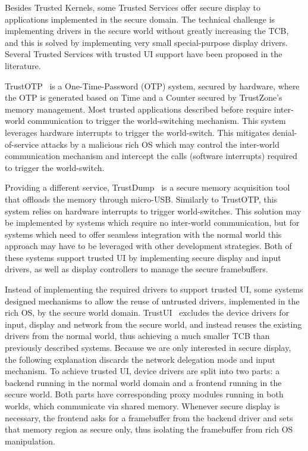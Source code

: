 Besides Trusted Kernels, some Trusted Services offer secure display to applications implemented in the secure domain. The technical challenge is implementing drivers in the secure world without greatly increasing the TCB, and this is solved by implementing very small special-purpose display drivers. Several Trusted Services with trusted UI support have been proposed in the literature.

TrustOTP~\cite{sun2015trustotp} is a One-Time-Password (OTP) system, secured by hardware, where the OTP is generated based on Time and a Counter secured by TrustZone's memory management. Most trusted applications described before require inter-world communication to trigger the world-switching mechanism. This system leverages hardware interrupts to trigger the world-switch. This mitigates denial-of-service attacks by a malicious rich OS which may control the inter-world communication mechanism and intercept the calls (software interrupts) required to trigger the world-switch. 

Providing a different service, TrustDump~\cite{sun2015reliable} is a secure memory acquisition tool that offloads the memory through micro-USB. Similarly to TrustOTP, this system relies on hardware interrupts to trigger world-switches. This solution may be implemented by systems which require no inter-world communication, but for systems which need to offer seamless integration with the normal world this approach may have to be leveraged with other development strategies. Both of these systems support trusted UI by implementing secure display and input drivers, as well as display controllers to manage the secure framebuffers.

Instead of implementing the required drivers to support trusted UI, some systems designed mechanisms to allow the reuse of untrusted drivers, implemented in the rich OS, by the secure world domain. TrustUI~\cite{li2014building} excludes the device drivers for input, display and network from the secure world, and instead reuses the existing drivers from the normal world, thus achieving a much smaller TCB than previously described systems. Because we are only interested in secure display, the following explanation discards the network delegation mode and input mechanism. To achieve trusted UI, device drivers are split into two parts: a backend running in the normal world domain and a frontend running in the secure world. Both parts have corresponding proxy modules running in both worlds, which communicate via shared memory. Whenever secure display is necessary, the frontend asks for a framebuffer from the backend driver and sets that memory region as secure only, thus isolating the framebuffer from rich OS manipulation. 

